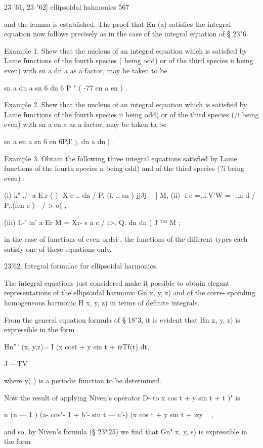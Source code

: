 {{{{{{{{23 '61, 23 "62] ellipsoidal hahmonics 567

and the lemma is established. The proof that En (a) satisfies the
integral equation now follows precisely as in the case of the integral
equation of § 23"6.

Example 1. Shew that the nucleus of an integral equation which is
satisfied by Lame functions of the fourth species ( being odd) or of
the third species ii being even) with sn a dn a as a factor, may be
taken to be

sn a dn a sn 6 dn 6 P " ( -77 en a en ) .

Example 2. Shew that the nucleus of an integral equation which is
satisfied by Lame functions of the fourth species ii being odd) or of
the third species (/i being even) with sn a en a as a factor, may be
taken ta be

sn a en a sn 6 en 6P,l' j, dn a dn | .

Example 3. Obtain the following three integral equations satisfied by
Lame functions of the fourth species n being odd) and of the third
species (?i being even) :

(i) k" ..'- a E.r ( ) -X c ,. dn / P. (i. ., sn ) jjJj '- ] M, (ii) -i
c =,.i.V'W = -.,n d / P,.(fcn c ) - / > o( ,

(iii) I.-' in' a Er M = Xr- s a c / i>. Q. dn dn ) J ™ M ;

in the case of functions of even ordei-, the functions of the
different types each satisfy one of these equations only.

23'62. Integral formulae fur ellipsoidal harmonics.

The integral equations just considered make it possible to obtain
elegant representations of the ellipsoidal harmonic Gn x, y, z) and of
the corre- sponding homogeneous harmonic H x, y, z) in terms of
definite integrals.

From the general equation formula of § 18"3, it is evident that Hn x,
y, z) is expressible in the form

Hn''' (x, y,z)= I (x cost + y sin t + izTf(t) dt,

J —TV

where y( ) is a periodic function to be determined.

Now the result of applying Niven's operator D- to x cos t + y sin t +
t )" is

n (n — 1 ) (a- cos"- 1 + b'- sin t — c'-) (x cos t + y sin t + izy ~ ,

and so, by Niven's formula (§ 23*25) we find that Gn" x, y, s) is
expressible in the form

}}}}}}}}

